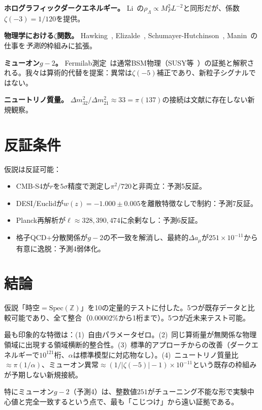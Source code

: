 \documentclass[11pt,a4paper]{article}
\newcommand{\Spec}{\mathrm{Spec}}
\begin{document}
\textbf{ホログラフィックダークエネルギー。} Li~\cite{Li2004}の$\rho_\Lambda \propto M_P^2 L^{-2}$と同形だが、係数$\zeta(-3) = 1/120$を提供。

\textbf{物理学における$\zeta$関数。} Hawking~\cite{Hawking1977}, Elizalde~\cite{Elizalde2012}, Schumayer-Hutchinson~\cite{Schumayer2011}, Manin~\cite{Manin1989}の仕事を\emph{予測的}枠組みに拡張。

\textbf{ミューオン$g-2$。} Fermilab測定~\cite{Muong2_2021}は通常BSM物理（SUSY等~\cite{Athron2021}）の証拠と解釈される。我々は算術的代替を提案：異常は$\zeta(-5)$補正であり、新粒子シグナルではない。

\textbf{ニュートリノ質量。} $\Delta m^2_{32}/\Delta m^2_{21} \approx 33 = \pi(137)$の接続は文献に存在しない新規観察。

\section{反証条件}

仮説は反証可能：
\begin{itemize}
\item CMB-S4が$r$を$5\sigma$精度で測定し$\pi^2/720$と非両立：予測5反証。
\item DESI/Euclidが$w(z) = -1.000 \pm 0.005$を離散特徴なしで制約：予測7反証。
\item Planck再解析が$\ell \approx 328, 390, 474$に余剰なし：予測6反証。
\item 格子QCD+分散関係が$g-2$の不一致を解消し、最終的$\Delta a_\mu$が$251 \times 10^{-11}$から有意に逸脱：予測4弱体化。
\end{itemize}

\section{結論}

仮説「時空$= \Spec(\mathbb{Z})$」を10の定量的テストに付した。5つが既存データと比較可能であり、全て整合（$0.00002\%$から1桁まで）。5つが近未来テスト可能。

最も印象的な特徴は：(1)~自由パラメータゼロ。(2)~同じ算術量が無関係な物理領域に出現する領域横断的整合性。(3)~標準的アプローチからの改善（ダークエネルギーで$10^{121}$桁、$\alpha$は標準模型に対応物なし）。(4)~ニュートリノ質量比$\approx \pi(1/\alpha)$、ミューオン異常$\approx (1/|\zeta(-5)|-1) \times 10^{-11}$という既存の枠組みが予期しない新規接続。

特にミューオン$g-2$（予測4）は、整数値$251$がチューニング不能な形で実験中心値と完全一致するという点で、最も「こじつけ」から遠い証拠である。
\end{document}
